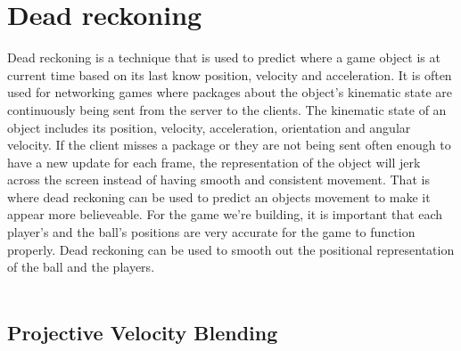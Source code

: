 \section{Dead reckoning}
Dead reckoning is a technique that is used to predict where a game object is at current time based on its last know position, velocity and acceleration.
It is often used for networking games where packages about the object's kinematic state are continuously being sent from the server to the clients.
The kinematic state of an object includes its position, velocity, acceleration, orientation and angular velocity.
If the client misses a package or they are not being sent often enough to have a new update for each frame, the representation of the object will jerk across the screen instead of having smooth and consistent movement.
That is where dead reckoning can be used to predict an objects movement to make it appear more believeable.
For the game we're building, it is important that each player's and the ball's positions are very accurate for the game to function properly.
Dead reckoning can be used to smooth out the positional representation of the ball and the players.
\\\\

\subsection{Projective Velocity Blending}
